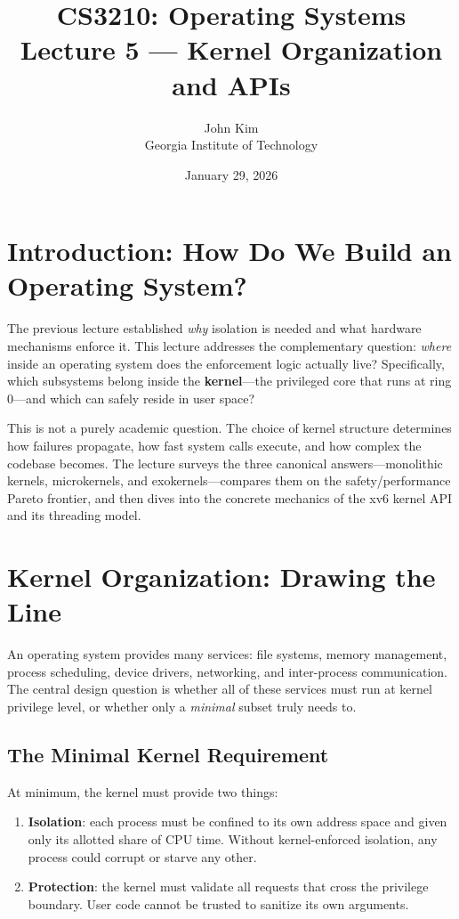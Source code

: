 \documentclass[11pt]{article}
\title{\textbf{CS3210: Operating Systems} \\ Lecture 5 --- Kernel Organization and APIs}
\author{John Kim \\ Georgia Institute of Technology}
\date{January 29, 2026}
\begin{document}
\maketitle
\tableofcontents
\newpage

\section{Introduction: How Do We Build an Operating System?}

The previous lecture established \emph{why} isolation is needed and what hardware mechanisms enforce it. This lecture addresses the complementary question: \emph{where} inside an operating system does the enforcement logic actually live? Specifically, which subsystems belong inside the \textbf{kernel}---the privileged core that runs at ring 0---and which can safely reside in user space?

This is not a purely academic question. The choice of kernel structure determines how failures propagate, how fast system calls execute, and how complex the codebase becomes. The lecture surveys the three canonical answers---monolithic kernels, microkernels, and exokernels---compares them on the safety/performance Pareto frontier, and then dives into the concrete mechanics of the xv6 kernel API and its threading model.

\section{Kernel Organization: Drawing the Line}

An operating system provides many services: file systems, memory management, process scheduling, device drivers, networking, and inter-process communication. The central design question is whether all of these services must run at kernel privilege level, or whether only a \emph{minimal} subset truly needs to.

\subsection{The Minimal Kernel Requirement}

At minimum, the kernel must provide two things:

\begin{enumerate}
    \item \textbf{Isolation}: each process must be confined to its own address space and given only its allotted share of CPU time. Without kernel-enforced isolation, any process could corrupt or starve any other.
    \item \textbf{Protection}: the kernel must validate all requests that cross the privilege boundary. User code cannot be trusted to sanitize its own arguments.
\end{enumerate}
\end{document}
